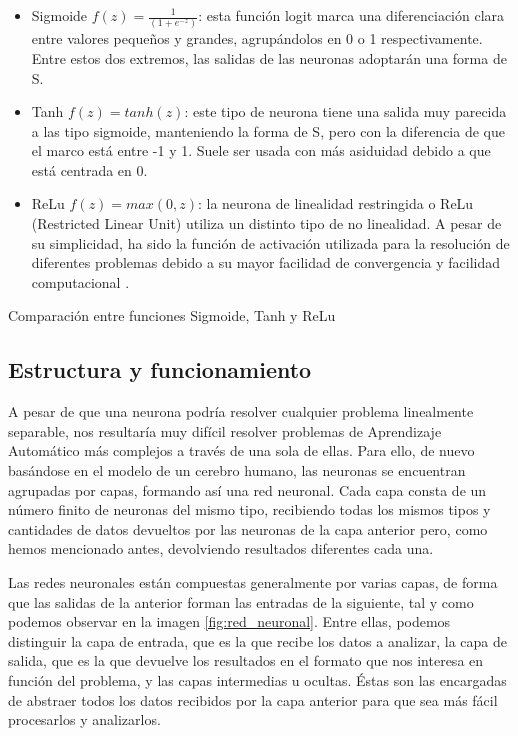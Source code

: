 \begin{itemize}
    \item Sigmoide $f(z) = \frac{1}{(1+e^{-z})}$: esta función logit marca una diferenciación clara entre valores pequeños y grandes, agrupándolos en 0 o 1 respectivamente. Entre estos dos extremos, las salidas de las neuronas adoptarán una forma de S.
    \item Tanh $f(z)= tanh(z)$: este tipo de neurona tiene una salida muy parecida a las tipo sigmoide, manteniendo la forma de S, pero con la diferencia de que el marco está entre -1 y 1. Suele ser usada con más asiduidad debido a que está centrada en 0.
    \item ReLu $f(z) = max(0,z)$: la neurona de linealidad restringida o ReLu (Restricted Linear Unit) utiliza un distinto tipo de no linealidad. A pesar de su simplicidad, ha sido la función de activación utilizada para la resolución de diferentes problemas debido a su mayor facilidad de convergencia y facilidad computacional \citep{Enyinna2018}.
\end{itemize}

%
       {Comparación entre funciones Sigmoide, Tanh y ReLu}

\subsection{Estructura y funcionamiento}
A pesar de que una neurona podría resolver cualquier problema linealmente separable, nos resultaría muy difícil resolver problemas de Aprendizaje Automático más complejos a través de una sola de ellas. Para ello, de nuevo basándose en el modelo de un cerebro humano, las neuronas se encuentran agrupadas por capas, formando así una red neuronal. Cada capa consta de un número finito de neuronas del mismo tipo, recibiendo todas los mismos tipos y cantidades de datos devueltos por las neuronas de la capa anterior pero, como hemos mencionado antes, devolviendo resultados diferentes cada una.

Las redes neuronales están compuestas generalmente por varias capas, de forma que las salidas de la anterior forman las entradas de la siguiente, tal y como podemos observar en la imagen \ref{fig:red_neuronal}. Entre ellas, podemos distinguir la capa de entrada, que es la que recibe los datos a analizar, la capa de salida, que es la que devuelve los resultados en el formato que nos interesa en función del problema, y las capas intermedias u ocultas. Éstas son las encargadas de abstraer todos los datos recibidos por la capa anterior para que sea más fácil procesarlos y analizarlos. 

